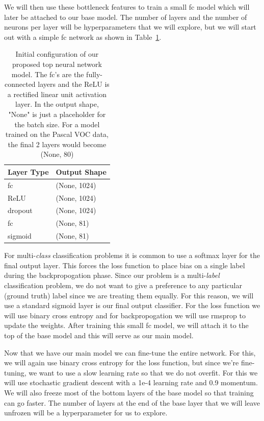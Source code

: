 \documentclass[10pt, a4paper, twocolumn]{article} %
\begin{document}
We will then use these bottleneck features to train a small fc model which will later be attached to our base model.  The number of layers and the number of neurons per layer will be hyperparameters that we will explore, but we will start out with a simple fc network as shown in Table~\ref{tab:top_model}.
\begin{table}
\centering
\caption{Initial configuration of our proposed top neural network model. The fc's are the fully-connected layers and the ReLU is a rectified linear unit activation layer. In the output shape, "None" is just a placeholder for the batch size.  For a model trained on the  Pascal VOC data, the final 2 layers would become (None, 80)}
\label{tab:top_model}
\begin{tabular}{ll}
\hline
Layer Type & Output Shape \\
\hline
fc      & (None, 1024) \\
ReLU    & (None, 1024) \\
dropout & (None, 1024) \\
fc      & (None, 81)   \\
sigmoid & (None, 81)   \\
\hline
\end{tabular}
\end{table}
For multi-\textit{class} classification problems it is common to use a softmax layer for the final output layer. This forces the loss function to place bias on a single label during the backpropogation phase.  Since our problem is a multi-\textit{label} classification problem, we do not want to give a preference to any particular (ground truth) label since we are treating them equally.  For this reason, we will use a standard sigmoid layer is our final output classifier.  For the loss function we will use binary cross entropy and for backpropogation we will use rmsprop to update the weights.  After training this small fc model, we will attach it to the top of the base model and this will serve as our main model. 

Now that we have our main model we can fine-tune the entire network.  For this, we will again use binary cross entropy for the loss function, but since we're fine-tuning, we want to use a slow learning rate so that we do not overfit.  For this we will use stochastic gradient descent with a 1e-4 learning rate and 0.9 momentum. We will also freeze most of the bottom layers of the base model so that training can go faster.  The number of layers at the end of the base layer that we will leave unfrozen will be a hyperparameter for us to explore.
\end{document}
